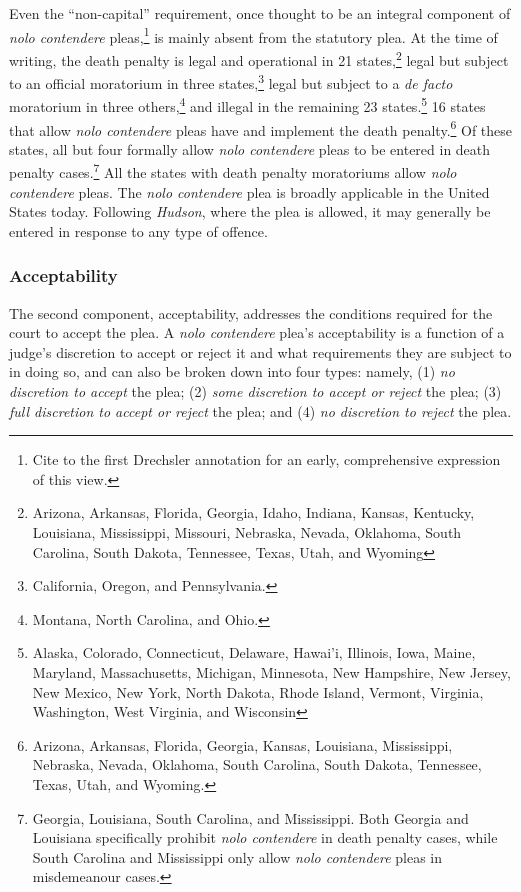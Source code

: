 Even the ``non-capital'' requirement, once thought to be an integral component of \textit{nolo contendere} pleas,\footnote{Cite to the first Drechsler annotation for an early, comprehensive expression of this view.} is mainly absent from the statutory plea. At the time of writing, the death penalty is legal and operational in 21 states,\footnote{Arizona, Arkansas, Florida, Georgia, Idaho, Indiana, Kansas, Kentucky, Louisiana, Mississippi, Missouri, Nebraska, Nevada, Oklahoma, South Carolina, South Dakota, Tennessee, Texas, Utah, and Wyoming} legal but subject to an official moratorium in three states,\footnote{California, Oregon, and Pennsylvania.} legal but subject to a \textit{de facto} moratorium in three others,\footnote{Montana, North Carolina, and Ohio.} and illegal in the remaining 23 states.\footnote{Alaska, Colorado, Connecticut, Delaware, Hawai'i, Illinois, Iowa, Maine, Maryland, Massachusetts, Michigan, Minnesota, New Hampshire, New Jersey, New Mexico, New York, North Dakota, Rhode Island, Vermont, Virginia, Washington, West Virginia, and Wisconsin} 16 states that allow \textit{nolo contendere} pleas have and implement the death penalty.\footnote{Arizona, Arkansas, Florida, Georgia, Kansas, Louisiana, Mississippi, Nebraska, Nevada, Oklahoma, South Carolina, South Dakota, Tennessee, Texas, Utah, and Wyoming.}  Of these states, all but four formally allow \textit{nolo contendere} pleas to be entered in death penalty cases.\footnote{Georgia, Louisiana, South Carolina, and Mississippi. Both Georgia and Louisiana specifically prohibit \textit{nolo contendere} in death penalty cases, while South Carolina and Mississippi only allow \textit{nolo contendere} pleas in misdemeanour cases.} All the states with death penalty moratoriums allow \textit{nolo contendere} pleas. The \textit{nolo contendere} plea is broadly applicable in the United States today. Following \textit{Hudson}, where the plea is allowed, it may generally be entered in response to any type of offence.

\subsubsection{Acceptability}

The second component, acceptability, addresses the conditions required for the court to accept the plea. A \textit{nolo contendere} plea's acceptability is a function of a judge’s discretion to accept or reject it and what requirements they are subject to in doing so, and can also be broken down into four types: namely, (1) \textit{no discretion to accept} the plea; (2) \textit{some discretion to accept or reject} the plea; (3) \textit{full discretion to accept or reject} the plea; and (4) \textit{no discretion to reject} the plea.

